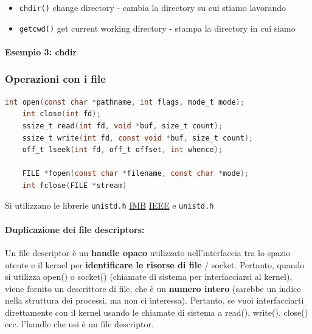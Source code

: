\begin{itemize}
    \item \texttt{chdir()} change directory - cambia la directory su cui stiamo lavorando
    \item \texttt{getcwd()} get current working directory - stampa la directory in cui siamo
\end{itemize}

    \paragraph{Esempio 3: chdir}
    

\subsubsection{Operazioni con i file}

\begin{lstlisting}[language=C]
    int open(const char *pathname, int flags, mode_t mode);
    int close(int fd);
    ssize_t read(int fd, void *buf, size_t count);
    ssize_t write(int fd, const void *buf, size_t count);
    off_t lseek(int fd, off_t offset, int whence);

    FILE *fopen(const char *filename, const char *mode);
    int fclose(FILE *stream)    
\end{lstlisting}
    
Si utilizzano le librerie \texttt{unistd.h} \href{https://www.ibm.com/docs/en/aix/7.2?topic=files-fcntlh-file}{IMB} \href{https://pubs.opengroup.org/onlinepubs/009604499/basedefs/fcntl.h.html}{IEEE} e \texttt{unistd.h}
\paragraph{Duplicazione dei file descriptors:}
Un file descriptor è un \textbf{handle opaco} utilizzato nell'interfaccia tra lo spazio utente e il kernel per \textbf{identificare le risorse di file} / socket. Pertanto, quando si utilizza open() o socket() (chiamate di sistema per interfacciarsi al kernel), viene fornito un descrittore di file, che è un \textbf{numero intero} (sarebbe un indice nella struttura dei processi, ma non ci interessa). Pertanto, se vuoi interfacciarti direttamente con il kernel  usando le chiamate di sistema a read(), write(), close() ecc. l'handle che usi è un file descriptor.

